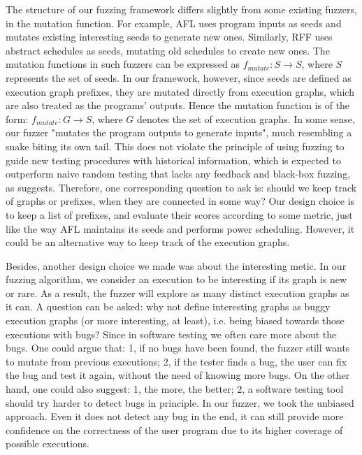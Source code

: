 The structure of our fuzzing framework differs slightly from some existing fuzzers, in the mutation function. For example, AFL uses program inputs as seeds and mutates existing interesting seeds to generate new ones. Similarly, RFF uses abstract schedules as seeds, mutating old schedules to create new ones. The mutation functions in such fuzzers can be expressed as $f_{mutate}: S \to S$, where $S$ represents the set of seeds.  In our framework, however, since seeds are defined as execution graph prefixes, they are mutated directly from execution graphs, which are also treated as the programs' outputs. Hence the mutation function is of the form: $f_{mutate}: G \to S$, where $G$ denotes the set of execution graphs. In some sense, our fuzzer "mutates the program outputs to generate inputs", much resembling a snake biting its own tail. This does not violate the principle of using fuzzing to guide new testing procedures with historical information, which is expected to outperform naive random testing that lacks any feedback and black-box fuzzing, as \cite{sage} suggests. Therefore, one corresponding question to ask is: should we keep track of graphs or prefixes, when they are connected in some way? Our design choice is to keep a list of prefixes, and evaluate their scores according to some metric, just like the way AFL maintains its seeds and performs power scheduling. However, it could be an alternative way to keep track of the execution graphs.

Besides, another design choice we made was about the interesting metic. In our fuzzing algorithm, we consider an execution to be interesting if its graph is new or rare. As a result, the fuzzer will explore as many distinct execution graphs as it can. A question can be asked: why not define interesting graphs as buggy execution graphs (or more interesting, at least), i.e. being biased towards those executions with bugs? Since in software testing we often care more about the bugs. One could argue that: 1, if no bugs have been found, the fuzzer still wants to mutate from previous executions; 2, if the tester finds a bug, the user can fix the bug and test it again, without the need of knowing more bugs. On the other hand, one could also suggest: 1, the more, the better; 2, a software testing tool should try harder to detect bugs in principle. In our fuzzer, we took the unbiased approach. Even it does not detect any bug in the end, it can still provide more confidence on the correctness of the user program due to its higher coverage of possible executions.

